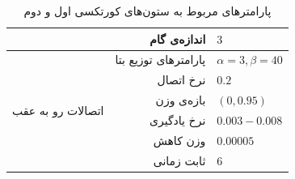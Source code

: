 \documentclass[12pt]{report}
\begin{document}
\begin{table}[p]
{\begin{tabular}{|rrrl|}
		\multicolumn{1}{|r|}{}                                          & \multicolumn{2}{r|}{اندازه‌ی گام}                                                                                          & $3$                       \\ \hline
		\multicolumn{1}{|r|}{\multirow{6}{*}{اتصالات رو به عقب}}        & \multicolumn{2}{r|}{پارامتر‌های توزیع بتا}                                                                                 & $\alpha=3, \beta=40$               \\ \cline{2-4} 
		\multicolumn{1}{|r|}{}                                          & \multicolumn{2}{r|}{نرخ اتصال}                                                                                             & $0.2$                     \\ \cline{2-4} 
		\multicolumn{1}{|r|}{}                                          & \multicolumn{2}{r|}{بازه‌ی وزن}                                                                                            & $(0, 0.95)$               \\ \cline{2-4} 
		\multicolumn{1}{|r|}{}                                          & \multicolumn{2}{r|}{نرخ یادگیری}                                                                                           & $0.003 - 0.008$           \\ \cline{2-4} 
		\multicolumn{1}{|r|}{}                                          & \multicolumn{2}{r|}{وزن کاهش}                                                                                              & $0.00005$                \\ \cline{2-4} 
		\multicolumn{1}{|r|}{}                                          & \multicolumn{2}{r|}{ثابت زمانی}                                                                                            & $6$                       \\ \hline
	\end{tabular}}
\caption{\label{table:parameters-cc-1-2}پارامتر‌های مربوط به ستون‌های کورتکسی اول و دوم}
\end{table}
\end{document}
